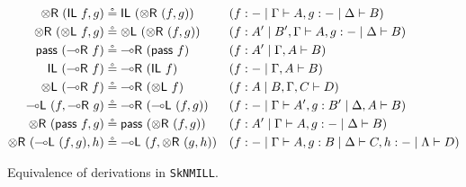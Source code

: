 \documentclass[runningheads]{llncs}
\newcommand{\tl}{\otimes \mathsf{L}}
\newcommand{\tr}{\otimes \mathsf{R}}
\newcommand{\lright}{{\multimap}\mathsf{R}}
\newcommand{\lleft}{{\multimap}\mathsf{L}}
\newcommand{\pass}{\mathsf{pass}}
\newcommand{\unitl}{\mathsf{IL}}
\newcommand{\unitr}{\mathsf{IR}}
\newcommand{\lolliR}{\lright}
\newcommand{\ax}{\mathsf{ax}}
\newcommand{\ot}{\otimes}
\newcommand{\lolli}{\multimap}
\newcommand{\I}{\mathsf{I}}
\newcommand{\SkNMILL}{\texttt{SkNMILL}}
\begin{document}
\begin{figure}[t]
\begin{align*}\small
  \tr \text{ } (\unitl \text{ } f, g) &\circeq \unitl \text{ } (\tr \text{ } (f , g)) &&(f : - \mid \Gamma \vdash A , g : - \mid \Delta \vdash B)
  \\
  \tr \text{ } (\tl \text{ } f, g) &\circeq \tl \text{ } (\tr \text{ } (f , g)) &&(f : A' \mid B' , \Gamma \vdash A , g : - \mid \Delta \vdash B)
  \\
  \pass \text{ } (\lolliR \text{ } f) &\circeq \lolliR \text{ } (\pass \text{ } f) &&(f : A' \mid \Gamma , A \vdash B)
  \\
  \unitl \text{ } (\lolliR \text{ } f) &\circeq \lolliR \text{ } (\unitl \text{ } f) &&(f : - \mid \Gamma , A \vdash B)
  \\
  \tl \text{ } (\lolliR \text{ } f) &\circeq \lolliR \text{ } (\tl \text{ } f) &&(f : A \mid B , \Gamma , C \vdash D)
  \\
  \lleft \text{ } (f, \lolliR \text{ } g) &\circeq \lolliR \text{ } (\lleft \text{ } (f, g)) &&(f : - \mid \Gamma \vdash A', g : B' \mid \Delta , A \vdash B)
  \\%
  \tr \text{ } (\pass \text{ } f, g) &\circeq \pass \text{ } (\tr \text{ } (f, g)) &&(f : A' \mid \Gamma \vdash A, g : - \mid \Delta \vdash B)
  \\
  \tr \text{ } (\lleft \text{ } (f , g), h) & \circeq \lleft \text{ } (f, \tr \text{ } (g, h)) &&(f: - \mid \Gamma \vdash A, g : B \mid \Delta \vdash C, h : - \mid \Lambda \vdash D)
\end{align*}
\caption{Equivalence of derivations in \SkNMILL.}
\label{fig:circeq}
\end{figure}
\end{document}
